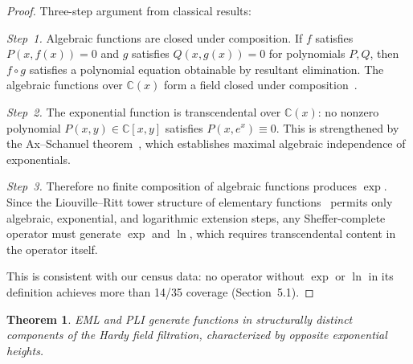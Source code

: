\documentclass[10pt,twocolumn]{article}
\newtheorem{theorem}{Theorem}
\theoremstyle{remark}
\begin{document}
\begin{proof}
Three-step argument from classical results:

\emph{Step~1.} Algebraic functions are closed under composition. If $f$ satisfies $P(x,f(x))=0$ and $g$ satisfies $Q(x,g(x))=0$ for polynomials $P,Q$, then $f \circ g$ satisfies a polynomial equation obtainable by resultant elimination. The algebraic functions over $\mathbb{C}(x)$ form a field closed under composition~\cite{bronstein2005}.

\emph{Step~2.} The exponential function is transcendental over $\mathbb{C}(x)$: no nonzero polynomial $P(x,y) \in \mathbb{C}[x,y]$ satisfies $P(x,e^x) \equiv 0$. This is strengthened by the Ax--Schanuel theorem~\cite{ax1971}, which establishes maximal algebraic independence of exponentials.

\emph{Step~3.} Therefore no finite composition of algebraic functions produces $\exp$. Since the Liouville--Ritt tower structure of elementary functions~\cite{rosenlicht1972} permits only algebraic, exponential, and logarithmic extension steps, any Sheffer-complete operator must generate $\exp$ and $\ln$, which requires transcendental content in the operator itself.

This is consistent with our census data: no operator without $\exp$ or $\ln$ in its definition achieves more than 14/35 coverage (Section~5.1).
\end{proof}

\begin{theorem}\label{thm:tower_separation}
EML and PLI generate functions in structurally distinct components of the Hardy field filtration, characterized by opposite exponential heights.
\end{theorem}
\end{document}
